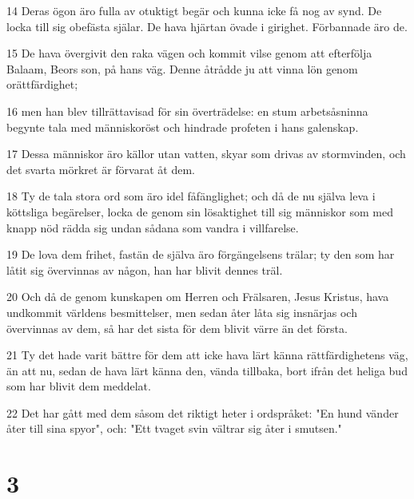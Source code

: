 \par 14 Deras ögon äro fulla av otuktigt begär och kunna icke få nog av synd. De locka till sig obefästa själar. De hava hjärtan övade i girighet. Förbannade äro de.
\par 15 De hava övergivit den raka vägen och kommit vilse genom att efterfölja Balaam, Beors son, på hans väg. Denne åtrådde ju att vinna lön genom orättfärdighet;
\par 16 men han blev tillrättavisad för sin överträdelse: en stum arbetsåsninna begynte tala med människoröst och hindrade profeten i hans galenskap.
\par 17 Dessa människor äro källor utan vatten, skyar som drivas av stormvinden, och det svarta mörkret är förvarat åt dem.
\par 18 Ty de tala stora ord som äro idel fåfänglighet; och då de nu själva leva i köttsliga begärelser, locka de genom sin lösaktighet till sig människor som med knapp nöd rädda sig undan sådana som vandra i villfarelse.
\par 19 De lova dem frihet, fastän de själva äro förgängelsens trälar; ty den som har låtit sig övervinnas av någon, han har blivit dennes träl.
\par 20 Och då de genom kunskapen om Herren och Frälsaren, Jesus Kristus, hava undkommit världens besmittelser, men sedan åter låta sig insnärjas och övervinnas av dem, så har det sista för dem blivit värre än det första.
\par 21 Ty det hade varit bättre för dem att icke hava lärt känna rättfärdighetens väg, än att nu, sedan de hava lärt känna den, vända tillbaka, bort ifrån det heliga bud som har blivit dem meddelat.
\par 22 Det har gått med dem såsom det riktigt heter i ordspråket: "En hund vänder åter till sina spyor", och: "Ett tvaget svin vältrar sig åter i smutsen."

\chapter{3}

